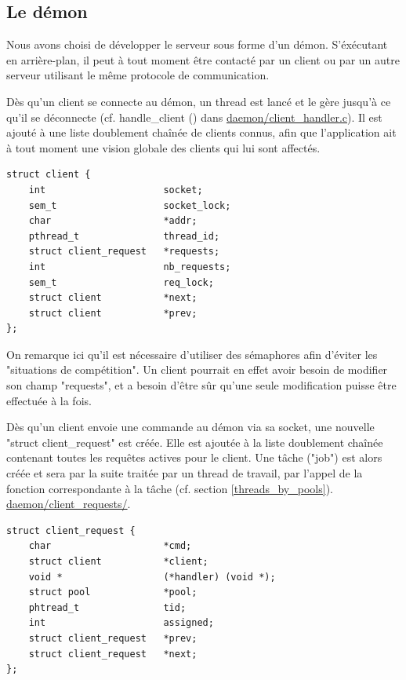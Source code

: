 	
\subsection{Le démon}

    Nous avons choisi de développer le serveur sous forme d'un démon.
S'éxécutant en arrière-plan, il peut à tout moment être contacté par un client
ou par un autre serveur utilisant le même protocole de communication.

    Dès qu'un client se connecte au démon, un thread est lancé et le gère
jusqu'à ce qu'il se déconnecte (cf. handle\_client () dans
\url{daemon/client_handler.c}). Il est ajouté à une liste doublement chaînée de
 clients connus, afin que l'application ait à tout moment une vision globale 
des clients qui lui sont affectés. 

\begin{lstlisting}
struct client {
    int                     socket;
    sem_t                   socket_lock;
    char                    *addr;
    pthread_t               thread_id;
    struct client_request   *requests;
    int                     nb_requests;
    sem_t                   req_lock;
    struct client           *next;
    struct client           *prev;
};
\end{lstlisting}

    On remarque ici qu'il est nécessaire d'utiliser des sémaphores afin d'éviter
les "situations de compétition". Un client pourrait en effet avoir besoin de
modifier son champ "requests", et a besoin d'être sûr qu'une seule modification
puisse être effectuée à la fois.

    Dès qu'un client envoie une commande au démon via sa socket, une nouvelle
"struct client\_request" est créée. Elle est ajoutée à la liste doublement
chaînée contenant toutes les requêtes actives pour le client. Une tâche ("job") 
est alors créée et sera par la suite traitée par un thread de travail, par 
l'appel de la fonction correspondante à la tâche (cf. section 
\ref{threads_by_pools}).
\url{daemon/client_requests/}.

\begin{lstlisting}
struct client_request {
    char                    *cmd;
    struct client           *client;
    void *                  (*handler) (void *);
    struct pool             *pool;
    phtread_t               tid;
    int                     assigned;
    struct client_request   *prev;
    struct client_request   *next;
};
\end{lstlisting}


